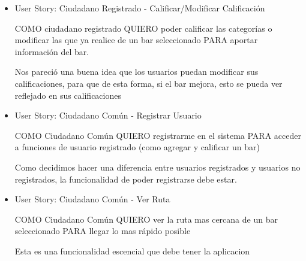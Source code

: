 \begin{itemize}
    \item User Story: Ciudadano Registrado - Calificar/Modificar Calificación
    
    COMO ciudadano registrado QUIERO poder calificar las categorías o modificar las que ya realice de un bar seleccionado PARA aportar información del bar.
    
     Nos pareció una buena idea que los usuarios puedan modificar sus calificaciones, para que de esta forma, si el bar mejora, esto se pueda ver reflejado en sus calificaciones
    
    \item User Story: Ciudadano Común - Registrar Usuario
    
    COMO Ciudadano Común QUIERO registrarme en el sistema PARA acceder a funciones de usuario registrado (como agregar y calificar un bar)
    
     Como decidimos hacer una diferencia entre usuarios registrados y usuarios no registrados, la funcionalidad de poder registrarse debe estar.
    
    \item User Story: Ciudadano Común - Ver Ruta
    
    COMO Ciudadano Común QUIERO ver la ruta mas cercana de un bar seleccionado PARA llegar lo mas rápido posible
    
     Esta es una funcionalidad escencial que debe tener la aplicacion
    
    
\end{itemize}
